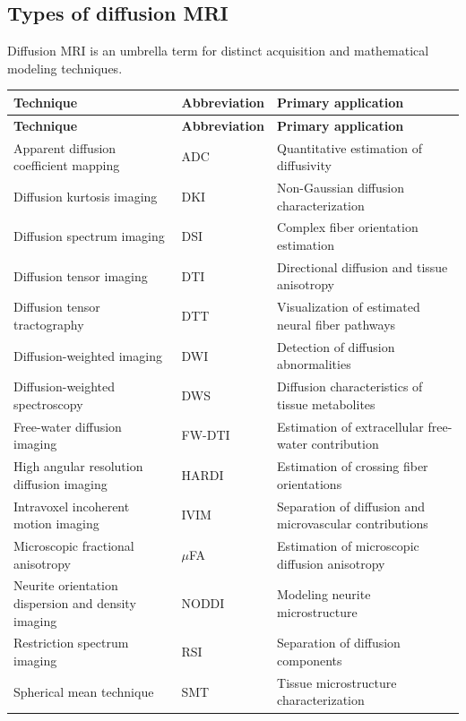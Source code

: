\subsection{Types of diffusion MRI}
Diffusion MRI is an umbrella term for distinct acquisition and mathematical modeling techniques.
\begin{longtable}{@{}p{}p{}p{}@{}}
\toprule
\textbf{Technique} & \textbf{Abbreviation} & \textbf{Primary application} \\
\midrule
\endfirsthead
\toprule
\textbf{Technique} & \textbf{Abbreviation} & \textbf{Primary application} \\
\midrule
\endhead
Apparent diffusion coefficient mapping & ADC & Quantitative estimation of diffusivity \\
Diffusion kurtosis imaging & DKI & Non-Gaussian diffusion characterization \\
Diffusion spectrum imaging & DSI & Complex fiber orientation estimation \\
Diffusion tensor imaging & DTI & Directional diffusion and tissue anisotropy \\
Diffusion tensor tractography & DTT & Visualization of estimated neural fiber pathways \\
Diffusion-weighted imaging & DWI & Detection of diffusion abnormalities \\
Diffusion-weighted spectroscopy & DWS & Diffusion characteristics of tissue metabolites \\
Free-water diffusion imaging & FW-DTI & Estimation of extracellular free-water contribution \\
High angular resolution diffusion imaging & HARDI & Estimation of crossing fiber orientations \\
Intravoxel incoherent motion imaging & IVIM & Separation of diffusion and microvascular contributions \\
Microscopic fractional anisotropy & $\mu$FA & Estimation of microscopic diffusion anisotropy \\
Neurite orientation dispersion and density imaging & NODDI & Modeling neurite microstructure \\
Restriction spectrum imaging & RSI & Separation of diffusion components \\
Spherical mean technique & SMT & Tissue microstructure characterization \\
\bottomrule
\end{longtable}

